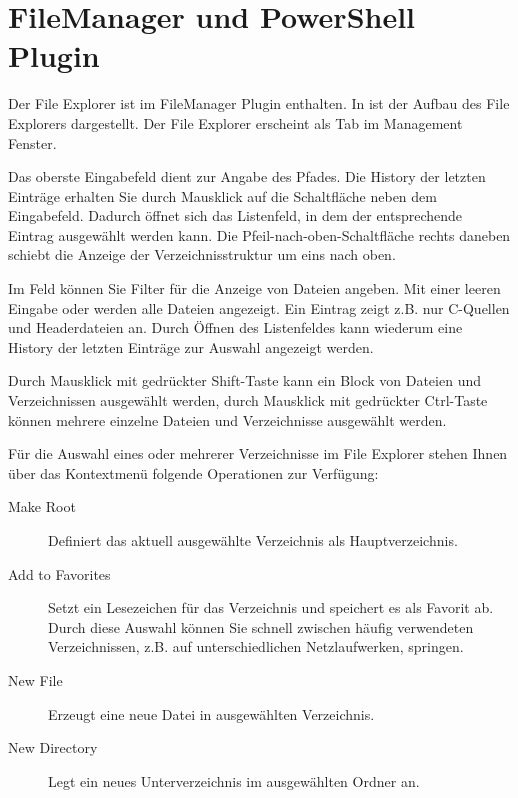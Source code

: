 \section{FileManager und PowerShell Plugin}\label{sec:file_explorer}

Der File Explorer  ist im FileManager Plugin enthalten. In  ist der Aufbau des File Explorers dargestellt. Der File Explorer erscheint als Tab  im Management Fenster.

Das oberste Eingabefeld dient zur Angabe des Pfades. Die History der letzten Einträge erhalten Sie durch Mausklick auf die Schaltfläche neben dem Eingabefeld. Dadurch öffnet sich das Listenfeld, in dem der entsprechende Eintrag ausgewählt werden kann. Die Pfeil-nach-oben-Schaltfläche rechts daneben schiebt die Anzeige der Verzeichnisstruktur um eins nach oben.

Im Feld  können Sie Filter für die Anzeige von Dateien angeben. Mit einer leeren Eingabe oder \codeline{*} werden alle Dateien angezeigt. Ein Eintrag  zeigt z.B. nur C-Quellen und Headerdateien an. Durch Öffnen des Listenfeldes kann wiederum eine History der letzten Einträge zur Auswahl angezeigt werden.


Durch Mausklick mit gedrückter Shift-Taste kann ein Block von Dateien und Verzeichnissen ausgewählt werden, durch Mausklick mit gedrückter Ctrl-Taste können mehrere einzelne Dateien und Verzeichnisse ausgewählt werden.

Für die Auswahl eines oder mehrerer Verzeichnisse im File Explorer stehen Ihnen über das Kontextmenü folgende Operationen zur Verfügung:

\begin{description}
\item[Make Root] Definiert das aktuell ausgewählte Verzeichnis als Hauptverzeichnis.
\item[Add to Favorites] Setzt ein Lesezeichen für das Verzeichnis und speichert es als Favorit ab. Durch diese Auswahl können Sie schnell zwischen häufig verwendeten Verzeichnissen, z.B. auf unterschiedlichen Netzlaufwerken, springen.
\item[New File] Erzeugt eine neue Datei in ausgewählten Verzeichnis.
\item[New Directory] Legt ein neues Unterverzeichnis im ausgewählten Ordner an.
\end{description}

